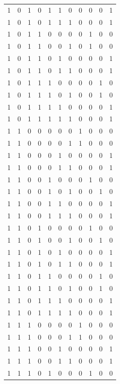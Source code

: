 \begin{longtable}{|c|c|c|c|c|c|c|c|c|c|c|}
1 & 0 & 1 & 0 & 1 & 1 & 0 &  0 & 0 & 0 & 1 \\
1 & 0 & 1 & 0 & 1 & 1 & 1 &  0 & 0 & 0 & 1 \\
1 & 0 & 1 & 1 & 0 & 0 & 0 &  0 & 1 & 0 & 0 \\
1 & 0 & 1 & 1 & 0 & 0 & 1 &  0 & 1 & 0 & 0 \\
1 & 0 & 1 & 1 & 0 & 1 & 0 &  0 & 0 & 0 & 1 \\
1 & 0 & 1 & 1 & 0 & 1 & 1 &  0 & 0 & 0 & 1 \\
1 & 0 & 1 & 1 & 1 & 0 & 0 &  0 & 0 & 1 & 0 \\
1 & 0 & 1 & 1 & 1 & 0 & 1 &  0 & 0 & 1 & 0 \\
1 & 0 & 1 & 1 & 1 & 1 & 0 &  0 & 0 & 0 & 1 \\
1 & 0 & 1 & 1 & 1 & 1 & 1 &  0 & 0 & 0 & 1 \\
1 & 1 & 0 & 0 & 0 & 0 & 0 &  1 & 0 & 0 & 0 \\
1 & 1 & 0 & 0 & 0 & 0 & 1 &  1 & 0 & 0 & 0 \\
1 & 1 & 0 & 0 & 0 & 1 & 0 &  0 & 0 & 0 & 1 \\
1 & 1 & 0 & 0 & 0 & 1 & 1 &  0 & 0 & 0 & 1 \\
1 & 1 & 0 & 0 & 1 & 0 & 0 &  0 & 1 & 0 & 0 \\
1 & 1 & 0 & 0 & 1 & 0 & 1 &  0 & 0 & 1 & 0 \\
1 & 1 & 0 & 0 & 1 & 1 & 0 &  0 & 0 & 0 & 1 \\
1 & 1 & 0 & 0 & 1 & 1 & 1 &  0 & 0 & 0 & 1 \\
1 & 1 & 0 & 1 & 0 & 0 & 0 &  0 & 1 & 0 & 0 \\
1 & 1 & 0 & 1 & 0 & 0 & 1 &  0 & 0 & 1 & 0 \\
1 & 1 & 0 & 1 & 0 & 1 & 0 &  0 & 0 & 0 & 1 \\
1 & 1 & 0 & 1 & 0 & 1 & 1 &  0 & 0 & 0 & 1 \\
1 & 1 & 0 & 1 & 1 & 0 & 0 &  0 & 0 & 1 & 0 \\
1 & 1 & 0 & 1 & 1 & 0 & 1 &  0 & 0 & 1 & 0 \\
1 & 1 & 0 & 1 & 1 & 1 & 0 &  0 & 0 & 0 & 1 \\
1 & 1 & 0 & 1 & 1 & 1 & 1 &  0 & 0 & 0 & 1 \\
1 & 1 & 1 & 0 & 0 & 0 & 0 &  1 & 0 & 0 & 0 \\
1 & 1 & 1 & 0 & 0 & 0 & 1 &  1 & 0 & 0 & 0 \\
1 & 1 & 1 & 0 & 0 & 1 & 0 &  0 & 0 & 0 & 1 \\
1 & 1 & 1 & 0 & 0 & 1 & 1 &  0 & 0 & 0 & 1 \\
1 & 1 & 1 & 0 & 1 & 0 & 0 &  0 & 1 & 0 & 0 \\

\end{longtable}
